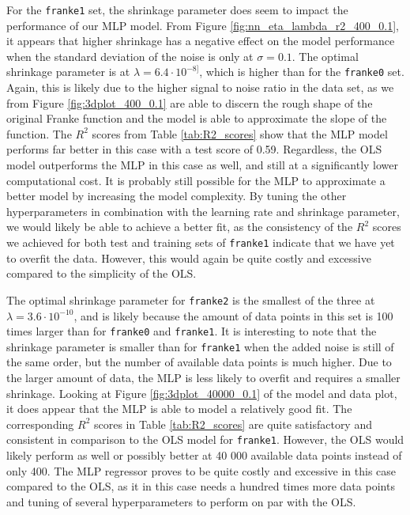 \documentclass[a4paper, 11pt, twocolumn]{article}
\begin{document}
For the \texttt{franke1} set, the shrinkage parameter does seem to impact the
performance of our MLP model. From Figure \ref{fig:nn_eta_lambda_r2_400_0.1}, it
appears that higher shrinkage has a negative effect on the model performance when
the standard deviation of the noise is only at $\sigma=0.1$. The
optimal shrinkage parameter is at $\lambda=6.4\cdot 10^{-8]}$, which is higher
than for the \texttt{franke0} set. Again, this is likely due to the higher signal
to noise ratio in the data set, as we from Figure \ref{fig:3dplot_400_0.1} are
able to discern the rough shape of the original Franke function and the model is
able to approximate the slope of the function. The $R^2$ scores from Table
\ref{tab:R2_scores} show that the MLP model performs far better in this case with
a test score of 0.59. Regardless, the OLS model outperforms the MLP in this case
as well, and still at a significantly lower computational cost. It is probably
still possible for the MLP to approximate a better model by increasing the model
complexity. By tuning the other hyperparameters in combination with the learning
rate and shrinkage parameter, we would likely be able to achieve a better fit, as
the consistency of the $R^2$ scores we achieved for both test and training sets
of \texttt{franke1} indicate that we have yet to overfit the data. However, this
would again be quite costly and excessive compared to the simplicity of the OLS.

The optimal shrinkage parameter for \texttt{franke2} is the smallest of the three
at $\lambda=3.6\cdot 10^{-10}$, and is likely because the amount of data points
in this set is 100 times larger than for \texttt{franke0} and \texttt{franke1}.
It is interesting to note that the shrinkage parameter is smaller than for
\texttt{franke1} when the added noise is still of the same order, but the number
of available data points is much higher. Due to the larger amount of data, the
MLP is less likely to overfit and requires a smaller shrinkage. Looking at Figure
\ref{fig:3dplot_40000_0.1} of the model and data plot, it does appear that the
MLP is able to model a relatively good fit. The corresponding $R^2$ scores in
Table \ref{tab:R2_scores} are quite satisfactory and consistent in comparison to
the OLS model for \texttt{franke1}. However, the OLS would likely perform as well
or possibly better at 40 000 available data points instead of only 400. The MLP
regressor proves to be quite costly and excessive in this case compared to the
OLS, as it in this case needs a hundred times more data points and tuning of
several hyperparameters to perform on par with the OLS. \\
\end{document}
